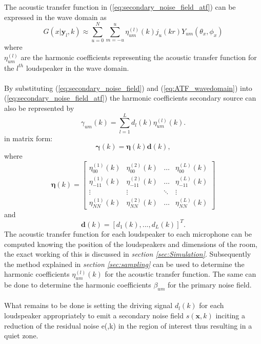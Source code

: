 The acoustic transfer function in (\ref{eq:secondary_noise_field_atf}) can be expressed in the wave domain as \cite{Betlehem2005}
\begin{equation}
    G(x|\mathbf{y}_l,k) \approx \sum_{u=0}^N \sum_{m=-u}^u\eta^{(l)}_{um}(k)j_u(kr)Y_{um}(\theta_x,\phi_x)
    \label{eq:ATF_wavedomain}
\end{equation}
where\\
$\eta^{(l)}_{um}$ are the harmonic coefficients representing the acoustic transfer function for the $l^{th}$ loudspeaker in the wave domain.\\\\
By substituting (\ref{eq:secondary_noise_field}) and (\ref{eq:ATF_wavedomain}) into (\ref{eq:secondary_noise_field_atf}) the harmonic coefficients secondary source can also be represented by
\begin{equation}
    \gamma_{um}(k) = \sum_{l=1}^Ld_l(k)\eta_{um}^{(l)}(k).
\end{equation}
in matrix form:
\begin{equation}
    {\boldsymbol{\gamma}}(k)=\boldsymbol{\eta}(k) \mathbf{d}(k),
\end{equation}
where\\
\begin{equation}
    \boldsymbol{\eta}(k) = 
    \begin{bmatrix}
        \eta_{00}^{(1)}(k) & \eta_{00}^{(2)}(k) & \hdots & \eta_{00}^{(L)}(k)\\
        \eta_{-11}^{(1)}(k) & \eta_{-11}^{(2)}(k) & \hdots & \eta_{-11}^{(L)}(k)\\
        \vdots & \vdots & \ddots & \vdots\\
        \eta_{NN}^{(1)}(k) & \eta_{NN}^{(2)}(k) & \hdots & \eta_{NN}^{(L)}(k)
    \end{bmatrix}
    \label{eq:secondary_coef_vector}
\end{equation}
and\\
\begin{equation}
    \boldsymbol{d}(k) = [d_1(k),...,d_L(k)]^T.
\end{equation}
The acoustic transfer function for each loudspeaker to each microphone can be computed knowing the position of the loudspeakers and dimensions of the room, the exact working of this is discussed in \textit{section \ref{sec:Simulation}}. Subsequently the method explained in \textit{section \ref{sec:sampling}} can be used to determine the harmonic coefficients $\eta^{(l)}_{um}(k)$ for the acoustic transfer function. The same can be done to determine the harmonic coefficients $\beta_{um}$ for the primary noise field.\\\\
What remains to be done is setting the driving signal $d_l(k)$ for each loudspeaker appropriately to emit a secondary noise field $s(\mathbf{x},k)$ inciting a reduction of the residual noise e(,k) in the region of interest thus resulting in a quiet zone.


